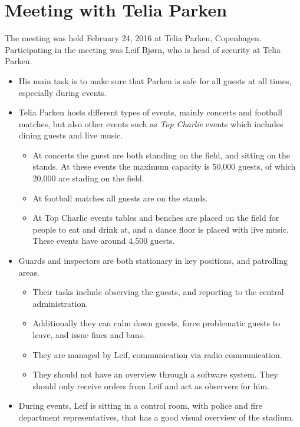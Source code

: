 \section{Meeting with Telia Parken}\label{sec:telia_parken_meeting_summary}

The meeting was held February 24, 2016 at Telia Parken, Copenhagen. Participating in the meeting was Leif Bjørn, who is head of security at Telia Parken.

\begin{itemize}
    \item His main task is to make sure that Parken is safe for all guests at all times, especially during events.
    \item Telia Parken hosts different types of events, mainly concerts and football matches, but also other events such as \emph{Top Charlie} events which includes dining guests and live music. 
    \begin{itemize}
        \item At concerts the guest are both standing on the field, and sitting on the stands. At these events the maximum capacity is 50,000 guests, of which 20,000 are stading on the field.
        \item At football matches all guests are on the stands.
        \item At Top Charlie events tables and benches are placed on the field for people to eat and drink at, and a dance floor is placed with live music. These events have around 4,500 guests.
    \end{itemize}
    \item Guards and inspectors are both stationary in key positions, and patrolling areas.
    \begin{itemize}
        \item Their tasks include observing the guests, and reporting to the central administration.
        \item Additionally they can calm down guests, force problematic guests to leave, and issue fines and bans.
        \item They are managed by Leif, communication via radio communication.
        \item They should not have an overview through a software system. They should only receive orders from Leif and act as observers for him.
    \end{itemize}
    \item During events, Leif is sitting in a control room, with police and fire department representatives, that has a good visual overview of the stadium.

\end{itemize}
